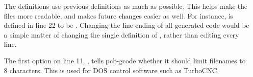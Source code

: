 \documentclass[11pt]{book}
\begin{document}

The definitions use previous definitions as much as possible. This helps make the files more readable, and makes future changes easier as well. For instance,  is defined in line 22 to be . Changing the line ending of all generated code would be a simple matter of changing the single definition of , rather than editing every line.

The first option on line 11, , tells pcb-gcode whether it should limit filenames to 8 characters. This is used for DOS control software such as TurboCNC.
\end{document}
